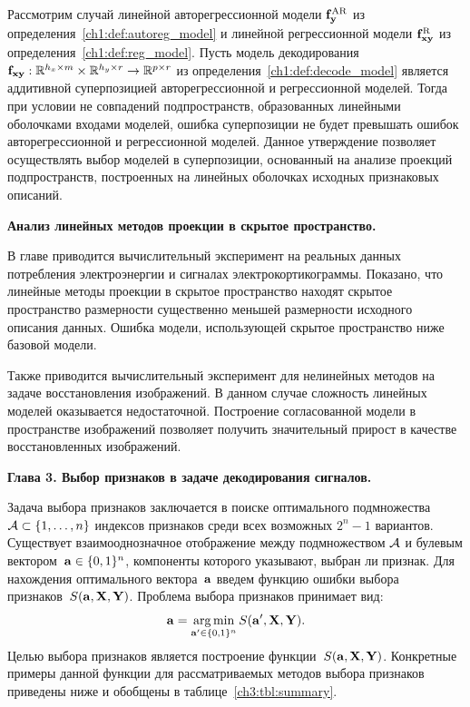 \documentclass[11pt, a5paper]{dissert}
\begin{document}
Рассмотрим случай линейной авторегрессионной модели $\mathbf{f}^{\text{AR}}_{\mathbf{y}}$ из определения~\ref{ch1:def:autoreg_model} и линейной регрессионной модели $\mathbf{f}^{\text{R}}_{\mathbf{x}\mathbf{y}}$ из определения~\ref{ch1:def:reg_model}. 
Пусть модель декодирования $\mathbf{f}_{\mathbf{x}\mathbf{y}}: \mathbb{R}^{h_x \times m} \times \mathbb{R}^{h_y \times r} \rightarrow \mathbb{R}^{p \times r}$ из определения~\ref{ch1:def:decode_model} является аддитивной суперпозицией авторегрессионной и регрессионной моделей.
Тогда при условии не совпадений подпространств, образованных линейными оболочками входами моделей, ошибка суперпозиции не будет превышать ошибок авторегрессионной и регрессионной моделей.
Данное утверждение позволяет осуществлять выбор моделей в суперпозиции, основанный на анализе проекций подпространств, построенных на линейных оболочках исходных признаковых описаний.

\textbf{Анализ линейных методов проекции в скрытое пространство.}
\label{sec:ch2:exp_linear}

В главе приводится вычислительный эксперимент на реальных данных потребления электроэнергии и сигналах электрокортикограммы. 
Показано, что линейные методы проекции в скрытое пространство находят скрытое пространство размерности существенно меньшей размерности исходного описания данных.
Ошибка модели, использующей скрытое пространство ниже базовой модели.

Также приводится вычислительный эксперимент для нелинейных методов на задаче восстановления изображений.
В данном случае сложность линейных моделей оказывается недостаточной.
Построение согласованной модели в пространстве изображений позволяет получить значительный прирост в качестве восстановленных изображений.

\textbf{Глава 3. Выбор признаков в задаче декодирования сигналов.}
\label{ch:qpfs}

Задача выбора признаков заключается в поиске оптимального подмножества~$\mathcal{A} \subset \{ 1, \dots, n \}$ индексов признаков среди всех возможных $2^n - 1$ вариантов. 
Существует взаимооднозначное отображение между подмножеством $\mathcal{A}$ и булевым вектором~$\mathbf{a} \in \{0, 1\}^n$, компоненты которого указывают, выбран ли признак. 
Для нахождения оптимального вектора~$\mathbf{a}$ введем функцию ошибки выбора признаков~$S(\mathbf{a}, \mathbf{X}, \mathbf{Y})$. 
Проблема выбора признаков принимает вид:
\begin{equation}
	\mathbf{a} = \mathop{\arg \min}\limits_{\mathbf{a}' \in \{0, 1\}^n} S(\mathbf{a}', \mathbf{X}, \mathbf{Y}).
	\label{ch3:eq:feature_selection}
\end{equation}
Целью выбора признаков является построение функции~$S (\mathbf{a}, \mathbf{X}, \mathbf{Y})$. Конкретные примеры данной функции для рассматриваемых методов выбора признаков приведены ниже и обобщены в таблице~\ref{ch3:tbl:summary}.
\end{document}
